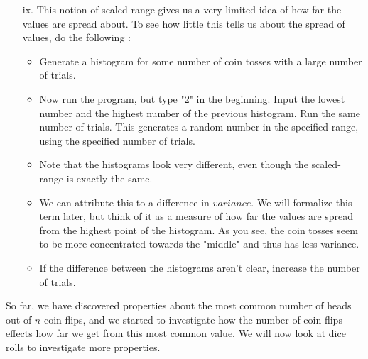 \documentclass[11pt]{article}
\newif\ifsolutions
\begin{document}
\begin{enumerate}
\begin{enumerate}
\item[ix.] This notion of scaled range gives us a very limited idea of how far the values are spread about. To see how little this tells us about the spread of values, do the following :
\begin{itemize}
\item Generate a histogram for some number of coin tosses with a large number of trials.
\item Now run the program, but type "2" in the beginning. Input the lowest number and the highest number of the previous histogram. Run the same number of trials. This generates a random number in the specified range, using the specified number of trials.
\item Note that the histograms look very different, even though the scaled-range is exactly the same.
\item We can attribute this to a difference in $variance$. We will formalize this term later, but think of it as a measure of how far the values are spread from the highest point of the histogram. As you see, the coin tosses seem to be more concentrated towards the "middle" and thus has less variance.
\item If the difference between the histograms aren't clear, increase the number of trials.
\end{itemize}


\ifsolutions
{\color{blue}{Students should see that the second hist looks uniform. Also note that a $``.''$ instead of $``*''$ should be interpreted as part of the range in these histograms.}}
\fi
\end{enumerate}

So far, we have discovered properties about the most common number of heads out of $n$ coin flips, and we started to investigate how the number of coin flips effects how far we get from this most common value. We will now look at dice rolls to investigate more properties.


\end{enumerate}
\end{document}
